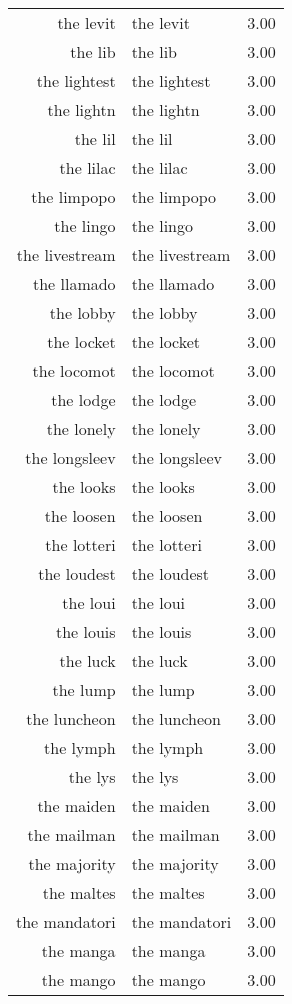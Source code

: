 \begin{table}[ht]
\begin{tabular}{rlr}
  the levit & the levit & 3.00 \\ 
  the lib & the lib & 3.00 \\ 
  the lightest & the lightest & 3.00 \\ 
  the lightn & the lightn & 3.00 \\ 
  the lil & the lil & 3.00 \\ 
  the lilac & the lilac & 3.00 \\ 
  the limpopo & the limpopo & 3.00 \\ 
  the lingo & the lingo & 3.00 \\ 
  the livestream & the livestream & 3.00 \\ 
  the llamado & the llamado & 3.00 \\ 
  the lobby & the lobby & 3.00 \\ 
  the locket & the locket & 3.00 \\ 
  the locomot & the locomot & 3.00 \\ 
  the lodge & the lodge & 3.00 \\ 
  the lonely & the lonely & 3.00 \\ 
  the longsleev & the longsleev & 3.00 \\ 
  the looks & the looks & 3.00 \\ 
  the loosen & the loosen & 3.00 \\ 
  the lotteri & the lotteri & 3.00 \\ 
  the loudest & the loudest & 3.00 \\ 
  the loui & the loui & 3.00 \\ 
  the louis & the louis & 3.00 \\ 
  the luck & the luck & 3.00 \\ 
  the lump & the lump & 3.00 \\ 
  the luncheon & the luncheon & 3.00 \\ 
  the lymph & the lymph & 3.00 \\ 
  the lys & the lys & 3.00 \\ 
  the maiden & the maiden & 3.00 \\ 
  the mailman & the mailman & 3.00 \\ 
  the majority & the majority & 3.00 \\ 
  the maltes & the maltes & 3.00 \\ 
  the mandatori & the mandatori & 3.00 \\ 
  the manga & the manga & 3.00 \\ 
  the mango & the mango & 3.00 \\ 

\end{tabular}
\end{table}
